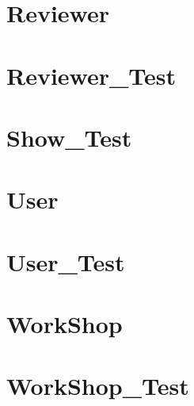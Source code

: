 \documentclass{article}
\begin{document}
\section{Reviewer}

\section{Reviewer\_Test}

\section{Show\_Test}

\section{User}

\section{User\_Test}

\section{WorkShop}

\section{WorkShop\_Test}

\end{document}
